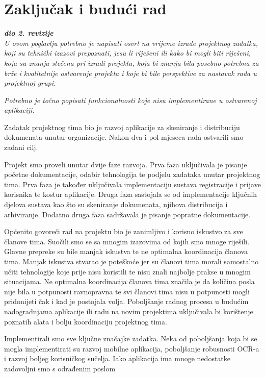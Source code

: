 \chapter{Zaključak i budući rad}
		
		\textbf{\textit{dio 2. revizije}}\\
		
		 \textit{U ovom poglavlju potrebno je napisati osvrt na vrijeme izrade projektnog zadatka, koji su tehnički izazovi prepoznati, jesu li riješeni ili kako bi mogli biti riješeni, koja su znanja stečena pri izradi projekta, koja bi znanja bila posebno potrebna za brže i kvalitetnije ostvarenje projekta i koje bi bile perspektive za nastavak rada u projektnoj grupi.}
		
		 \textit{Potrebno je točno popisati funkcionalnosti koje nisu implementirane u ostvarenoj aplikaciji.}
		 
		 	Zadatak projektnog tima bio je razvoj aplikacije za skeniranje i
		 distribuciju dokumenata unutar organizacije. Nakon dva i pol mjeseca rada ostvarili smo zadani cilj. \newline
		 	
			Projekt smo proveli unutar dvije faze razvoja. Prva faza uključivala
		je pisanje početne dokumentacije, odabir tehnologija te podjelu zadataka unutar projektnog tima. Prva faza je također uključivala implementaciju sustava registracije i prijave korisnika te kostur aplikacije. Druga faza sastojala se od implementacije ključnih djelova sustava kao što su skeniranje dokumenata, njihova distribucija i arhiviranje. Dodatno druga faza sadržavala je pisanje popratne dokumentacije.\newline
		 	
		 	Općenito govoreći rad na projektu bio je zanimljivo i korisno iskustvo
		 za sve članove tima. Suočili smo se sa mnogim izazovima od kojih smo mnoge riješili. Glavne prepreke su bile manjak iskustva te ne optimalna koordinacija članova tima. Manjak iskustva stvarao je poteškoće jer su članovi tima morali samostalno učiti tehnologije koje prije nisu koristili te nisu znali najbolje prakse u mnogim situacijama. Ne optimalna koordinacija članova tima značila je da količina posla nije bila u potpunosti ravnopravna te svi članovi tima nisu u potpunosti mogli pridonijeti čak i kad je postojala volja. Poboljšanje radnog procesa u budućim nadogradnjama aplikacije ili radu na novim projektima uključivala bi korištenje poznatih alata i bolju koordinaciju projektnog tima. \newline
		 
		 	Implementirali smo sve ključne značajke zadatka. Neka od poboljšanja
		 koja bi se mogla implementirati su razvoj mobilne aplikacija, poboljšanje robusnosti OCR-a i razvoj boljeg korisničkog sučelja. Iako aplikacija ima mnoge nedostatke zadovoljni smo s odrađenim poslom
		 	 
		 	
		
		\eject 